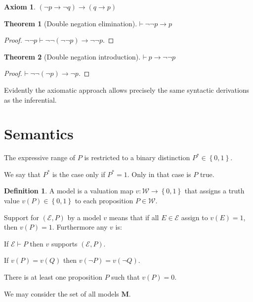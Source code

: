 \documentclass{amsbook}
\newcommand{\setsm}[1]{\left\{#1\right\}}
\newcommand{\wffs}{\mathcal W}
\newcommand{\infers}{\mathrel\vdash}
\newcommand{\theorem}{\mathord\vdash\medspace}
\newcommand{\then}{\mathrel\rightarrow}
\theoremstyle{definition}
\newtheorem{axm}{Axiom}[chapter]
\newtheorem{thm}{Theorem}[section]
\newtheorem{dfn}{Definition}[section]
\begin{document}
\begin{axm}
    $(\neg p \then \neg q) \then (q \then p)$
\end{axm}

\begin{thm}[Double negation elimination]
    $\theorem \neg\neg p \then p$
    \begin{proof}
        $\neg\neg p \infers \neg\neg(\neg\neg p) \then \neg\neg p$.
    \end{proof}
\end{thm}

\begin{thm}[Double negation introduction]
    $\theorem p \then \neg\neg p$
    \begin{proof}
        $\theorem \neg\neg(\neg p) \then \neg p$.
    \end{proof}
\end{thm}

Evidently the axiomatic approach allows precisely the same syntactic derivations as the inferential.


\section{Semantics}

The expressive range of $P$ is restricted to a binary distinction $P^* \in \setsm{0,1}$.

We say that $P^*$ is the case only if $P^* = 1$. Only in that case is $P$ true.

\begin{dfn}
    A model is a valuation map $v: \wffs \longrightarrow \setsm{0,1}$ that assigns a truth value $v(P) \in \setsm{0,1}$ to each proposition $P \in \wffs$.

    Support for $(\mathcal E, P)$ by a model $v$ means that if all $E \in \mathcal E$ assign to $v(E) = 1$, then $v(P) = 1$. Furthermore any $v$ is:
    \begin{description}[
            labelindent=\parindent,
            before={
                    \renewcommand\makelabel[1]{(##1).}
                }
        ]
        \item [inferential] If $\mathcal E \infers P$ then $v$ supports $(\mathcal E, P)$.
        \item [regular with respect to negation] If $v(P) = v(Q)$ then $v(\neg P) = v(\neg Q)$.
        \item [not trivial] There is at least one proposition $P$ such that $v(P) = 0$.
    \end{description}
    We may consider the set of all models $\mathbf M$.
\end{dfn}
\end{document}
